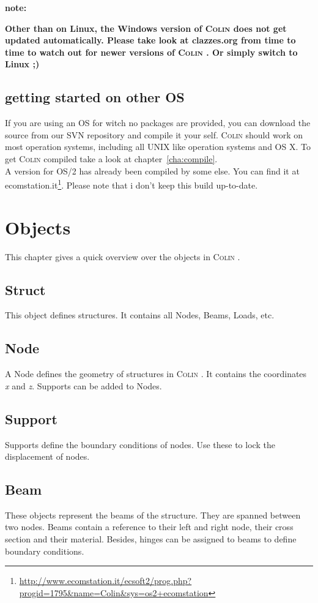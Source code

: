 \documentclass[a4paper,11pt]{report}
\newcommand{\Colin}[0]{\textsc{Colin }}
\begin{document}
\textbf{note:}
\begin{center}
\textbf{Other than on Linux, the Windows version of \Colin does not get updated automatically. Please take look at clazzes.org from time to time to watch out for newer versions of \Colin. Or simply switch to Linux ;)}
\end{center}

\section{getting started on other OS}
\label{sec:startOther}

If you are using an OS for witch no packages are provided, you can download the source from our SVN repository and compile it your self. \Colin should work on most operation systems, including all UNIX like operation systems and OS X. To get \Colin compiled take a look at chapter~\ref{cha:compile}.\\
A version for OS/2 has already been compiled by some else. You can find it at ecomstation.it\footnote{\url{http://www.ecomstation.it/ecsoft2/prog.php?progid=1795&name=Colin&sys=os2+ecomstation}}. Please note that i don't keep this build up-to-date.


\chapter{Objects}
\label{cha:objects}

This chapter gives a quick overview over the objects in \Colin.

\section{Struct}
This object defines structures. It contains all Nodes, Beams, Loads, etc. 

\section{Node}
A Node defines the geometry of structures in \Colin. It contains the coordinates \textit{x} and \textit{z}. Supports can be added to Nodes.

\section{Support}
Supports define the boundary conditions of nodes. Use these to lock the displacement of nodes.

\section{Beam}
These objects represent the beams of the structure. They are spanned between two nodes. Beams contain a reference to their left and right node, their cross section and their material. Besides, hinges can be assigned to beams to define boundary conditions.
\end{document}
